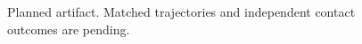\begin{figure}[t]
\centering
{}
\caption{Planned artifact. Matched trajectories and independent contact outcomes are pending.}
\label{fig:fig04_qualitative}
\end{figure}
